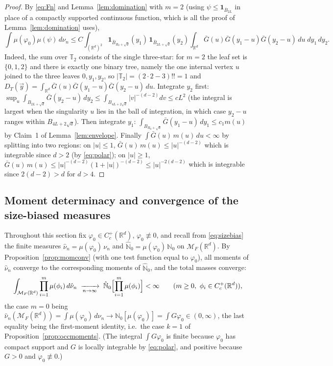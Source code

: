 \documentclass[11pt]{article}
\theoremstyle{definition}
\theoremstyle{remark}
\newcommand{\R}{\mathbb{R}}
\newcommand{\bN}{{\mathbb{N}_0}}                 %
\newcommand{\cM}{{\mathcal{M}_F(\R^d)}}          %
\newcommand{\Cc}{C_c^+(\R^d)}
\newcommand{\T}{\mathbb{T}}                    %
\newcommand{\nuh}{\hat{\nu}}
\newcommand{\Nh}{\hat{\mathbb{N}}_0}
\numberwithin{equation}{section}
\theoremstyle{plain}
\theoremstyle{definition}
\theoremstyle{remark}
\theoremstyle{plain}
\begin{document}
\begin{proof}
By \eqref{eq:Fn} and Lemma~\ref{lem:domination} with $m=2$ (using
$\psi\le\mathbf 1_{\overline B_{2L}}$ in place of a compactly supported continuous
function, which is all the proof of Lemma~\ref{lem:domination} uses),
\[
\int\mu(\varphi_0)\mu(\psi)\,d\nu_n
\le C\int_{(\R^d)^2}\mathbf 1_{\overline B_{R_0+\sqrt d}}(y_1)\,
\mathbf 1_{\overline B_{2L+\sqrt d}}(y_2)
\int_{\R^d}\bar G(u)\bar G(y_1-u)\bar G(y_2-u)\,du\;dy_1\,dy_2 .
\]
Indeed, the sum over $\T_2$ consists of the single three-star: for $m=2$
the leaf set is $\{0,1,2\}$ and there is exactly one binary tree, namely the
one internal vertex $u$ joined to the three leaves $0,y_1,y_2$, so
$|\T_2|=(2\cdot2-3)!!=1$ and $D_T(\vec y)=\int_{\R^d}\bar G(u)\bar
G(y_1-u)\bar G(y_2-u)\,du$. Integrate $y_2$
first: $\sup_{u}\int_{B_{2L+\sqrt d}}\bar G(y_2-u)\,dy_2
\le\int_{B_{4L+2\sqrt d}}|v|^{-(d-2)}dv\le cL^2$
(the integral is largest when the singularity $u$ lies in the ball of integration, in which case $y_2-u$ ranges within $B_{4L+2\sqrt d}$). Then integrate $y_1$:
$\int_{B_{R_0+\sqrt d}}\bar G(y_1-u)\,dy_1\le c_1m(u)$ by Claim~1 of
Lemma~\ref{lem:envelope}. Finally $\int\bar G(u)\,m(u)\,du<\infty$ by
splitting into two regions: on $|u|\le1$, $\bar G(u)\,m(u)\le|u|^{-(d-2)}$
which is integrable since $d>2$ (by \eqref{eq:polar}); on $|u|\ge1$,
$\bar G(u)\,m(u)\le|u|^{-(d-2)}(1+|u|)^{-(d-2)}\le |u|^{-2(d-2)}$ which
is integrable since $2(d-2)>d$ for $d>4$.
\end{proof}

\subsection{Moment determinacy and convergence of the size-biased measures}
\label{sec:biased}

Throughout this section fix $\varphi_0\in\Cc$, $\varphi_0\not\equiv0$, and recall from \eqref{eq:sizebias} the finite measures $\nuh_n=\mu(\varphi_0)\,\nu_n$ and $\Nh=\mu(\varphi_0)\,\bN$ on $\cM$.
By Proposition~\ref{prop:momconv} (with one test function equal to
$\varphi_0$), all moments of $\nuh_n$ converge to the corresponding moments
of $\Nh$, and the total masses converge:
\begin{equation}\label{eq:hatmoments}
\int_\cM\prod_{i=1}^m\mu(\phi_i)\,d\nuh_n
\;\xrightarrow[n\to\infty]{}\;
\Nh\Bigl[\prod_{i=1}^m\mu(\phi_i)\Bigr]<\infty
\qquad(m\ge0,\ \phi_i\in\Cc),
\end{equation}
the case $m=0$ being
$\nuh_n(\cM)=\int\mu(\varphi_0)\,d\nu_n\to\bN[\mu(\varphi_0)]
=\int G\varphi_0\in(0,\infty)$, the last equality being the first-moment
identity, i.e.\ the case $k=1$ of Proposition~\ref{prop:occmoments}.
(The integral $\int G\varphi_0$ is finite because $\varphi_0$ has compact
support and $G$ is locally integrable by \eqref{eq:polar}, and positive
because $G>0$ and $\varphi_0\not\equiv0$.)
\end{document}
